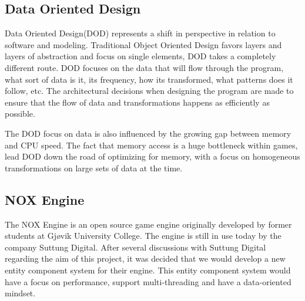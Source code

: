 \subsection*{Data Oriented Design}
Data Oriented Design(DOD) represents a shift in perspective in relation to software and modeling. 
Traditional Object Oriented Design favors layers and layers of abstraction and focus on single elements, DOD takes a completely different route. 
DOD focuses on the data that will flow through the program, what sort of data is it, its frequency, how its transformed, what patterns does it follow, etc. 
The architectural decisions when designing the program are made to ensure that the flow of data and transformations happens as efficiently as possible.
\cite{noel_dod_shoot_in_foot, dod_com} 

The DOD focus on data is also influenced by the growing gap between memory and CPU speed. 
The fact that memory access is a huge bottleneck within games, lead DOD down the road of optimizing for memory, 
with a focus on homogeneous transformations on large sets of data at the time.
\cite{pitfalls_of_OOP}

\subsection*{NOX Engine}
The NOX Engine is an open source game engine originally developed by former students at Gj{\o}vik University College.
The engine is still in use today by the company Suttung Digital. 
After several discussions with Suttung Digital regarding the aim of this project, it was decided that we would develop a new entity component system for their engine. 
This entity component system would have a focus on performance, support multi-threading and have a data-oriented mindset.